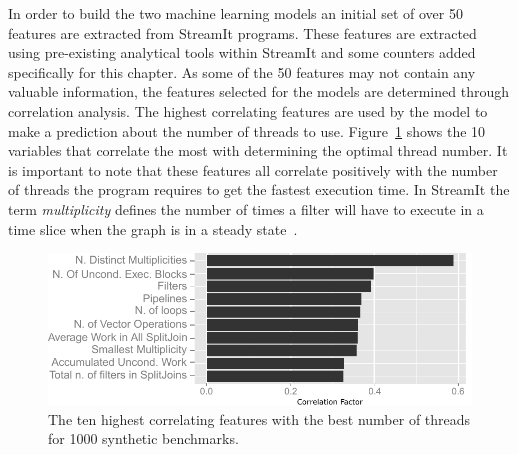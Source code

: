 In order to build the two machine learning models an initial set of over 50 features are extracted from StreamIt programs.
These features are extracted using pre-existing analytical tools within StreamIt and some counters added specifically for this chapter.
As some of the 50 features may not contain any valuable information, the features selected for the models are determined through correlation analysis.
The highest correlating features are used by the model to make a prediction about the number of threads to use.
Figure~\ref{fig:corr} shows the 10 variables that correlate the most with determining the optimal thread number.
It is important to note that these features all correlate positively with the number of threads the program requires to get the fastest execution time.
In StreamIt the term \textit{multiplicity} defines the number of times a filter will have to execute in a time slice when the graph is in a steady state~\cite{gordon2002streamcomp}.

\begin{figure}[t]
  \centering
 \includegraphics[width=1\textwidth]{streamit-paper/graphics/corrThreadRemix2.pdf}
  \caption{The ten highest correlating features with the best number of threads for 1000 synthetic benchmarks.}\label{fig:corr}
  \vspace{-1em}
\end{figure}
 
